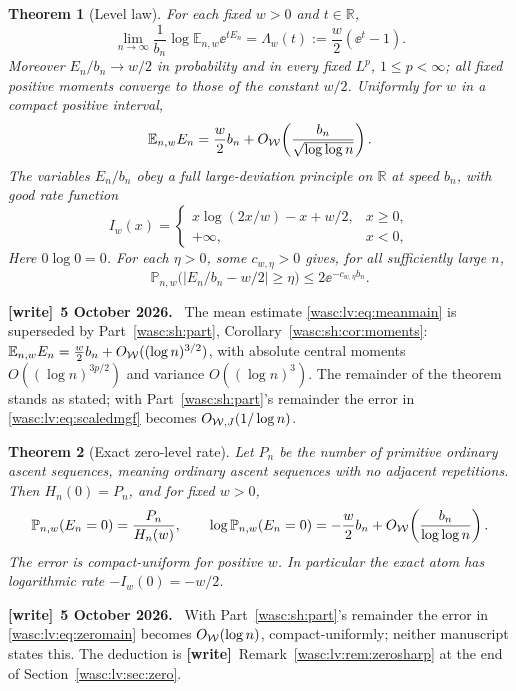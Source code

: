 \documentclass[11pt,a4paper]{article}
\newtheorem{theorem}{Theorem}[section]
\theoremstyle{remark}\newtheorem{remark}[theorem]{Remark}
\newcommand{\R}{\mathbb R}\newcommand{\Q}{\mathbb Q}\newcommand{\E}{\mathbb E}\newcommand{\Prob}{\mathbb P}
\numberwithin{equation}{section}
\newenvironment{writenote}[1][]{\par\smallskip\begingroup\small
 \noindent\textbf{[write]}\if\relax\detokenize{#1}\relax\else~\textbf{#1.}\fi\ }%
 {\par\endgroup\smallskip}
\newcommand{\wtag}{\textup{\textbf{[write]}}}
\begin{document}
\begin{theorem}[Level law]\label{wasc:lv:thm:law}
For each fixed $w>0$ and $t\in\R$,
\begin{equation}\label{wasc:lv:eq:mgfmain}
\lim_{n\to\infty}\frac1{b_n}\log\E_{n,w}\ee^{tE_n}
=\Lambda_w(t):=\frac w2(\ee^t-1).
\end{equation}
Moreover $E_n/b_n\to w/2$ in probability and in every fixed $L^p$, $1\le p<\infty$;
all fixed positive moments converge to those of the constant $w/2$. Uniformly for $w$ in a compact positive interval,
\begin{equation}\label{wasc:lv:eq:meanmain}
\E_{n,w}E_n=\frac w2b_n+O_{\Wc}\!\left(\frac{b_n}{\sqrt{\log\log n}}\right).
\end{equation}
The variables $E_n/b_n$ obey a full large-deviation principle on $\R$ at speed $b_n$, with good rate function
\begin{equation}\label{wasc:lv:eq:rate}
I_w(x)=\begin{cases}
x\log(2x/w)-x+w/2,&x\ge0,\\
+\infty,&x<0,
\end{cases}
\end{equation}
Here $0\log0=0$. For each $\eta>0$, some $c_{w,\eta}>0$ gives, for all sufficiently large $n$,
\begin{equation}\label{wasc:lv:eq:concentrationmain}
\Prob_{n,w}\bigl(|E_n/b_n-w/2|\ge\eta\bigr)
\le2\ee^{-c_{w,\eta}b_n}.
\end{equation}
\end{theorem}
\begin{writenote}[5 October 2026]
The mean estimate \eqref{wasc:lv:eq:meanmain} is superseded by Part~\ref{wasc:sh:part}, Corollary~\ref{wasc:sh:cor:moments}: $\E_{n,w}E_n=\frac w2b_n+O_{\Wc}((\log n)^{3/2})$, with absolute central moments $O((\log n)^{3p/2})$ and variance $O((\log n)^3)$. The remainder of the theorem stands as stated; with Part~\ref{wasc:sh:part}'s remainder the error in \eqref{wasc:lv:eq:scaledmgf} becomes $O_{\mathcal W,J}(1/\log n)$.
\end{writenote}

\begin{theorem}[Exact zero-level rate]\label{wasc:lv:thm:zeromain}
Let $P_n$ be the number of primitive ordinary ascent sequences, meaning ordinary ascent sequences with no adjacent repetitions. Then $H_n(0)=P_n$, and for fixed $w>0$,
\begin{equation}\label{wasc:lv:eq:zeromain}
\Prob_{n,w}(E_n=0)=\frac{P_n}{H_n(w)},\qquad
\log\Prob_{n,w}(E_n=0)=-\frac w2b_n+O_{\Wc}\!\left(\frac{b_n}{\log\log n}\right).
\end{equation}
The error is compact-uniform for positive $w$. In particular the exact atom has logarithmic rate $-I_w(0)=-w/2$.
\end{theorem}
\begin{writenote}[5 October 2026]
With Part~\ref{wasc:sh:part}'s remainder the error in \eqref{wasc:lv:eq:zeromain} becomes $O_{\mathcal W}(\log n)$, compact-uniformly; neither manuscript states this. The deduction is \wtag\ Remark~\ref{wasc:lv:rem:zerosharp} at the end of Section~\ref{wasc:lv:sec:zero}.
\end{writenote}
\end{document}
